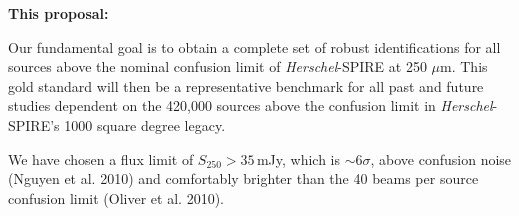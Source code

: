 \documentclass[12pt,a4paper]{article}
\newcommand{\herschel}{{\it Herschel}}
\newcommand{\ea}{et~al.}
\newcommand{\micron}{$\mu$m}
\begin{document}




{\bf This proposal:}
%

Our fundamental goal is to obtain a complete set of robust identifications for all sources above the nominal confusion limit of \herschel-SPIRE at 250 \micron. This gold standard will then be a representative benchmark for all past and future studies dependent on the 420,000 sources above the confusion limit in \herschel-SPIRE's 1000 square degree legacy.

We have chosen a flux limit of $S_{250}>35$\,mJy, which is $\sim 6\sigma$, above confusion noise (Nguyen et al. 2010) and comfortably brighter than the 40 beams per source confusion limit (Oliver et al. 2010). 
\end{document}
